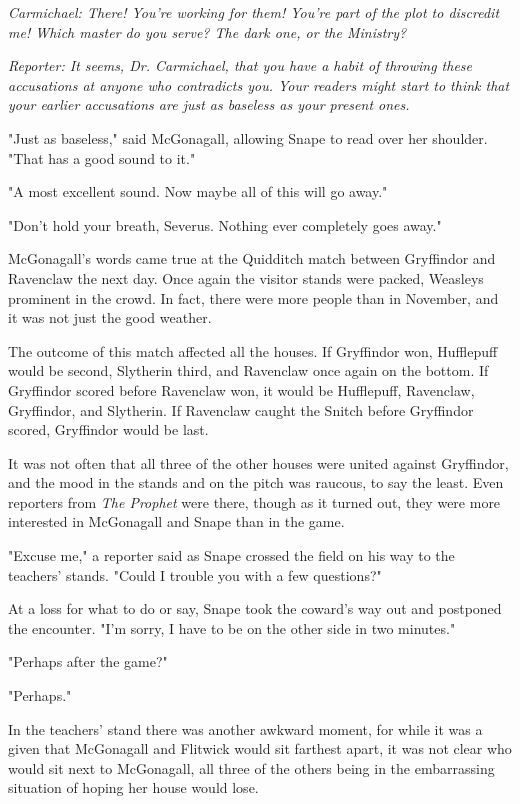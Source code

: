 \documentclass[a4paper,11pt]{article}
\begin{document}
\emph{Carmichael: There! You're working for them! You're part of the plot to discredit me! Which master do you serve? The dark one, or the Ministry?}

\emph{Reporter: It seems, Dr. Carmichael, that you have a habit of throwing these accusations at anyone who contradicts you. Your readers might start to think that your earlier accusations are just as baseless as your present ones.}

"Just as baseless," said McGonagall, allowing Snape to read over her shoulder. "That has a good sound to it."

"A most excellent sound. Now maybe all of this will go away."

"Don't hold your breath, Severus. Nothing ever completely goes away."

McGonagall's words came true at the Quidditch match between Gryffindor and Ravenclaw the next day. Once again the visitor stands were packed, Weasleys prominent in the crowd. In fact, there were more people than in November, and it was not just the good weather.

The outcome of this match affected all the houses. If Gryffindor won, Hufflepuff would be second, Slytherin third, and Ravenclaw once again on the bottom. If Gryffindor scored before Ravenclaw won, it would be Hufflepuff, Ravenclaw, Gryffindor, and Slytherin. If Ravenclaw caught the Snitch before Gryffindor scored, Gryffindor would be last.

It was not often that all three of the other houses were united against Gryffindor, and the mood in the stands and on the pitch was raucous, to say the least. Even reporters from \emph{The Prophet} were there, though as it turned out, they were more interested in McGonagall and Snape than in the game.

"Excuse me," a reporter said as Snape crossed the field on his way to the teachers' stands. "Could I trouble you with a few questions?"

At a loss for what to do or say, Snape took the coward's way out and postponed the encounter. "I'm sorry, I have to be on the other side in two minutes."

"Perhaps after the game?"

"Perhaps."

In the teachers' stand there was another awkward moment, for while it was a given that McGonagall and Flitwick would sit farthest apart, it was not clear who would sit next to McGonagall, all three of the others being in the embarrassing situation of hoping her house would lose.
\end{document}

